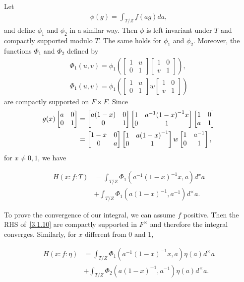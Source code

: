 Let
\begin{align}
    \phi(g) = \int_{T/Z} f(ag)da,
\end{align}
and define $\phi_1$ and $\phi_2$ in a similar way.
Then $\phi$ is left invariant under $T$ and compactly supported modulo $T$.
The same holds for $\phi_1$ and $\phi_2$.
Moreover, the functions $\Phi_1$ and $\Phi_2$ defined by 
\begin{align}
    \Phi_1(u, v) = \phi_1 \left(\begin{bmatrix} 1 & u \\ 0 & 1\end{bmatrix}\begin{bmatrix}1 & 0 \\ v& 1\end{bmatrix}\right), \\
    \Phi_1(u, v) = \phi_1 \left(\begin{bmatrix} 1 & u \\ 0 & 1\end{bmatrix}w\begin{bmatrix}1 & 0 \\ v& 1\end{bmatrix}\right)
\end{align}
are compactly supported on $F \times F$.
Since
\begin{equation}
\begin{aligned}
    g(x) \begin{bmatrix} a & 0 \\ 0 & 1 \end{bmatrix} &= \begin{bmatrix} a(1-x) & 0 \\ 0 & 1 \end{bmatrix} \begin{bmatrix} 1 & a^{-1}{(1-x)}^{-1}x \\ 0 & 1 \end{bmatrix} \begin{bmatrix} 1 & 0 \\ a & 1 \end{bmatrix} \\
    &= \begin{bmatrix} 1-x & 0 \\ 0 & a \end{bmatrix} \begin{bmatrix} 1 & a{(1-x)}^{-1} \\ 0 & 1 \end{bmatrix} w \begin{bmatrix} 1 & a^{-1} \\ 0 & 1 \end{bmatrix},
\end{aligned}
\end{equation}
for $x \neq 0, 1$, we have

\begin{equation}
\begin{aligned}
\label{3.1.10}
    H(x:f:T) &= \int_{T/Z} \Phi_1(a^{-1}(1-x)^{-1}x, a) d^{x}a \\
    &+ \int_{T/Z} \Phi_1 (a(1-x)^{-1}, a^{-1}) d^{\times}a. 
\end{aligned}
\end{equation}

To prove the convergence of our integral, we can assume $f$ positive.
Then the RHS of~\eqref{3.1.10} are compactly supported in $F^\times$ and therefore the integral converges.
Similarly, for $x$ different from 0 and 1,

\begin{equation}
\begin{aligned}
\label{3.1.11}
    H(x:f:\eta) &= \int_{T/Z} \Phi_1(a^{-1}(1-x)^{-1}x, a) \eta(a) d^\times a \\
    &+ \int_{T/Z} \Phi_2(a(1-x)^{-1}, a^{-1}) \eta(a) d^{\times} a.
\end{aligned}
\end{equation}

